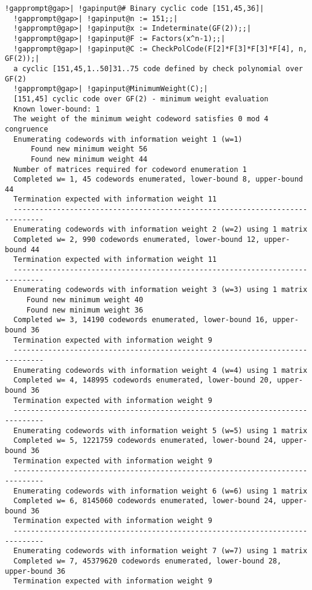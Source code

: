 \documentclass[a4paper,11pt]{report}
\begin{document}
{{\begin{Verbatim}[commandchars=!@|,fontsize=\small,frame=single,label=Example]
  !gapprompt@gap>| !gapinput@# Binary cyclic code [151,45,36]|
  !gapprompt@gap>| !gapinput@n := 151;;|
  !gapprompt@gap>| !gapinput@x := Indeterminate(GF(2));;|
  !gapprompt@gap>| !gapinput@F := Factors(x^n-1);;|
  !gapprompt@gap>| !gapinput@C := CheckPolCode(F[2]*F[3]*F[3]*F[4], n, GF(2));|
  a cyclic [151,45,1..50]31..75 code defined by check polynomial over GF(2)
  !gapprompt@gap>| !gapinput@MinimumWeight(C);|
  [151,45] cyclic code over GF(2) - minimum weight evaluation
  Known lower-bound: 1
  The weight of the minimum weight codeword satisfies 0 mod 4 congruence
  Enumerating codewords with information weight 1 (w=1)
      Found new minimum weight 56
      Found new minimum weight 44
  Number of matrices required for codeword enumeration 1
  Completed w= 1, 45 codewords enumerated, lower-bound 8, upper-bound 44
  Termination expected with information weight 11
  -----------------------------------------------------------------------------
  Enumerating codewords with information weight 2 (w=2) using 1 matrix
  Completed w= 2, 990 codewords enumerated, lower-bound 12, upper-bound 44
  Termination expected with information weight 11
  -----------------------------------------------------------------------------
  Enumerating codewords with information weight 3 (w=3) using 1 matrix
     Found new minimum weight 40
     Found new minimum weight 36
  Completed w= 3, 14190 codewords enumerated, lower-bound 16, upper-bound 36
  Termination expected with information weight 9
  -----------------------------------------------------------------------------
  Enumerating codewords with information weight 4 (w=4) using 1 matrix
  Completed w= 4, 148995 codewords enumerated, lower-bound 20, upper-bound 36
  Termination expected with information weight 9
  -----------------------------------------------------------------------------
  Enumerating codewords with information weight 5 (w=5) using 1 matrix
  Completed w= 5, 1221759 codewords enumerated, lower-bound 24, upper-bound 36
  Termination expected with information weight 9
  -----------------------------------------------------------------------------
  Enumerating codewords with information weight 6 (w=6) using 1 matrix
  Completed w= 6, 8145060 codewords enumerated, lower-bound 24, upper-bound 36
  Termination expected with information weight 9
  -----------------------------------------------------------------------------
  Enumerating codewords with information weight 7 (w=7) using 1 matrix
  Completed w= 7, 45379620 codewords enumerated, lower-bound 28, upper-bound 36
  Termination expected with information weight 9

\end{Verbatim}}}
\end{document}
